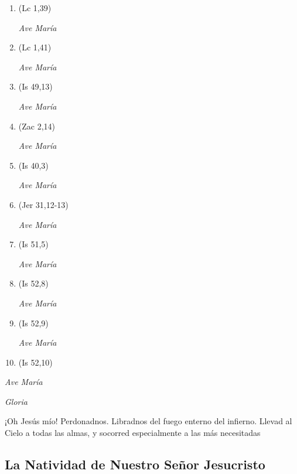 \documentclass[a4paper,11pt, oneside]{report}
\begin{document}
        \begin{enumerate}
          
          \item (Lc 1,39)
          
          \textit{Ave María}

          \item (Lc 1,41)
          
          \textit{Ave María}

          \item (Is 49,13)
          
          \textit{Ave María}

          \item (Zac 2,14)
          
          \textit{Ave María}

          \item (Is 40,3)

          \textit{Ave María}

          \item (Jer 31,12-13)
          
          \textit{Ave María}

          \item (Is 51,5)
          
          \textit{Ave María}

          \item (Is 52,8)
          
          \textit{Ave María}

          \item (Is 52,9)
          
          \textit{Ave María}

          \item (Is 52,10)

        \end{enumerate}

        \textit{Ave María} \par
        \indent\textit{Gloria} \par
        \indent¡Oh Jesús mío! Perdonadnos. Libradnos del fuego enterno del infierno. Llevad al Cielo a todas las almas, y socorred especialmente a las más 
        necesitadas
            
      \subsection*{La Natividad de Nuestro Señor Jesucristo}
      
\end{document}

